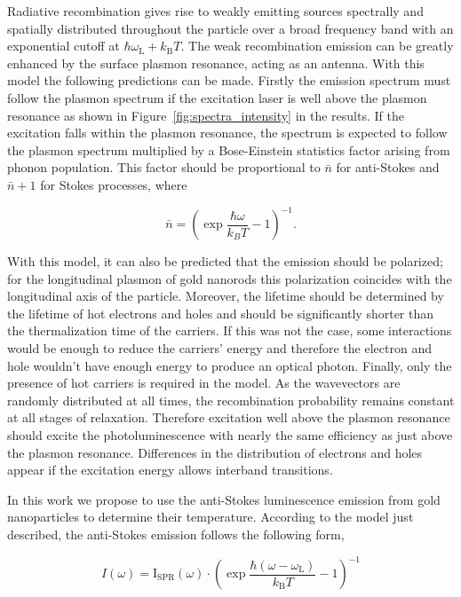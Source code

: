 \documentclass[journal=nalefd,manuscript=letter]{achemso}
\begin{document}
Radiative recombination gives rise to weakly emitting sources spectrally and
spatially distributed throughout the particle over a broad frequency band with
an exponential cutoff at $\hbar\omega_\textrm{L}+k_\textrm{B}T$. The weak
recombination emission can be greatly enhanced by the surface plasmon resonance,
acting as an antenna. With this model the following predictions can be made.
Firstly the emission spectrum must follow the plasmon spectrum if the excitation
laser is well above the plasmon resonance as shown in \mbox{Figure
\ref{fig:spectra_intensity}} in the results. If the excitation falls within the
plasmon resonance, the spectrum is expected to follow the plasmon spectrum
multiplied by a Bose-Einstein statistics factor arising from phonon population.
This factor should be proportional to $\bar{n}$ for anti-Stokes and $\bar{n}+1$
for Stokes processes, where

\begin{equation}
	\bar{n}=\left(\exp\frac{\hbar\omega}{k_BT}-1\right)^{-1}.
\end{equation}

With this model, it can also be predicted that the emission should be polarized;
for the longitudinal plasmon of gold nanorods this polarization coincides with
the longitudinal axis of the particle\cite{He2015}. Moreover, the lifetime
should be determined by the lifetime of hot electrons and holes and should be
significantly shorter than the thermalization time of the carriers. If this was
not the case, some interactions would be enough to reduce the carriers' energy
and therefore the electron and hole wouldn't have enough energy to produce an
optical photon. Finally, only the presence of hot carriers is required in the
model. As the wavevectors are randomly distributed at all times, the
recombination probability remains constant at all stages of relaxation.
Therefore excitation well above the plasmon resonance should excite the
photoluminescence with nearly the same efficiency as just above the plasmon
resonance\cite{Cheng2015}. Differences in the distribution of electrons and
holes appear if the excitation energy allows interband
transitions\cite{Sundararaman2014,Brown2016}. 

In this work we propose to use the anti-Stokes luminescence emission from gold
nanoparticles to determine their temperature. According to the model just
described, the anti-Stokes emission follows the following form,

\begin{equation}\label{eqn:fitting}
	I(\omega) =
	\textrm{I}_{\textrm{SPR}}(\omega)\cdot\left(\exp\frac{\hbar(\omega-\omega_\textrm{L})}{k_\textrm{B}T}-1\right)^{-1}
\end{equation}
\end{document}
